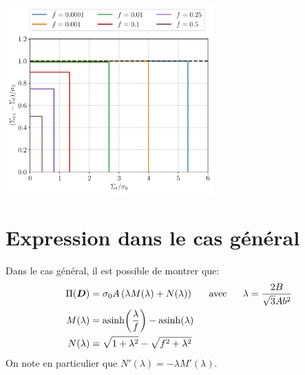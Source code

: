 \documentclass[french,english,12pt]{exam}
\begin{document}
\begin{questions}
\begin{solution}
\begin{R_figure}
\includegraphics[width=0.6\textwidth]{Gurson_cylinder_approx}
\end{R_figure}
\end{solution}

\section{Expression dans le cas général}
Dans le cas général, il est possible de montrer que:
  \begin{align}
    \Pi(\boldsymbol{D}) &= \sigma_0 A \left(\lambda M(\lambda)+N(\lambda)\right) \ \ \ \ \ \mathrm{avec} \ \ \ \ \ \lambda = \frac{2B}{\sqrt{3}Ab^2} \\
    M(\lambda) &=\mathrm{asinh}{\left( \frac{\lambda}{f} \right)} -\mathrm{asinh}{\left( \lambda \right)}\\
    N(\lambda) &= \sqrt{1 + \lambda^2} - \sqrt{f^2 + \lambda^2}
  \end{align}
On note en particulier que $N'(\lambda)= -\lambda M'(\lambda)$.


\end{questions}
\end{document}
